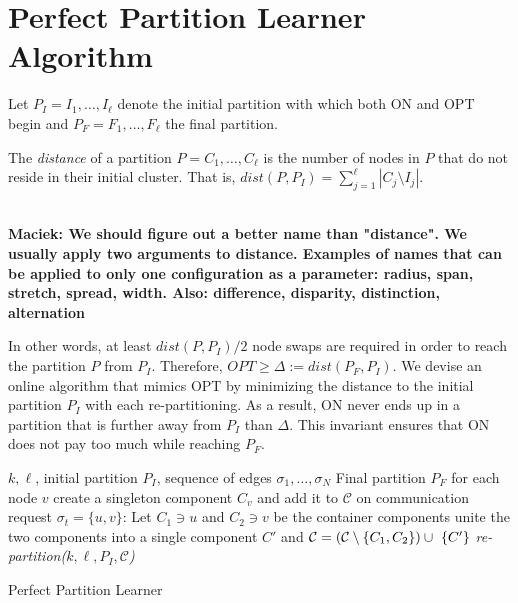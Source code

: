 \documentclass[manuscript,screen=true]{acmart}
\DeclarePairedDelimiter\set{\{}{\}}
\newcommand\maciek[1]{\color{brown}\textbf{\\ Maciek: #1}\color{black}}
\begin{document}
\section{Perfect Partition Learner Algorithm}
    
     
Let $P_I = I_1, \dots, I_{\ell}$ denote the initial partition with which both ON and OPT begin and
$P_F = F_1, \dots, F_{\ell}$ the final partition.
\begin{definition}	\label{def:dist}
    The \emph{distance} of a partition $P = C_1, \dots, C_{\ell}$ is the number of nodes in $P$ that do not reside in their initial cluster.
    That is,
    $dist(P, P_I) = \sum_{j=1}^{\ell} | C_j \setminus I_j |$. 
\end{definition}
\maciek{We should figure out a better name than "distance". We usually apply two arguments to distance. Examples of names that can be applied to only one configuration as a parameter: radius, span, stretch, spread, width. Also: difference, disparity, distinction, alternation}

In other words,
at least $dist(P, P_I)/2$ node swaps are required in order to reach the partition $P$ from $P_I$.
Therefore,
$OPT \geq \Delta:= dist(P_F, P_I) $.
We devise an online algorithm that mimics OPT by minimizing the distance to the initial partition $P_I$ with each re-partitioning.
As a result,
ON never ends up in a partition that is further away from $P_I$ than $\Delta$.
This invariant ensures that ON does not pay too much while reaching $P_F$.

\begin{algorithm}
    \renewcommand{\algorithmicrequire}{\textbf{Input:}}
    \renewcommand{\algorithmicensure}{\textbf{Output:}}
    \begin{algorithmic}[1]
        \Require 
        $k, \ell$,
        initial partition $P_I$,
        sequence of  edges $\sigma_1, \dots, \sigma_N$ 
        \Ensure Final partition $P_F$ 
        \State for each node $v$ create a singleton component $C_v$ and add it to $\mathcal{C}$ \label{line:initcomponents}
        \State on communication request $\sigma_t=\{u,v\}$:
        \State Let $C_1 \ni u$ and $C_2 \ni v$ be the container components
        \State unite the two components into a single component $C'$ and
        $\mathcal{C} = (\mathcal{C}\setminus\set{C_1, C_2}) \cup ~\set{C'}$ \label{line:mergecomponents}
        \State \textit{re-partition($k, \ell, P_I, \mathcal{C}$)} \label{line:rebalance} 
        \EndIf
        \EndIf
    \end{algorithmic}
    \caption{Perfect Partition Learner}
    \label{alg:ppl}
      \end{algorithm}
\end{document}
